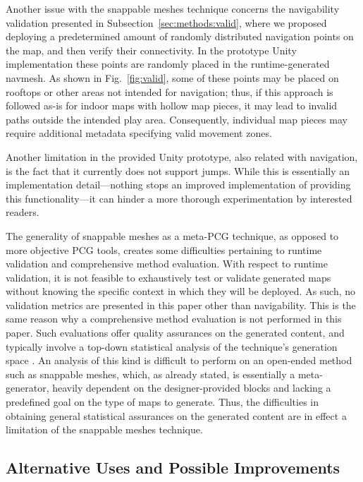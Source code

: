 \documentclass[journal]{IEEEtran}
\begin{document}
Another issue with the snappable meshes technique concerns the navigability
validation presented in Subsection~\ref{sec:methods:valid}, where we proposed
deploying a predetermined amount of randomly distributed navigation points on
the map, and then verify their connectivity. In the prototype Unity
implementation these points are randomly placed in the runtime-generated
navmesh. As shown in Fig.~\ref{fig:valid}, some of these points may be
placed on rooftops or other areas not intended for navigation; thus, if this
approach is followed as-is for indoor maps with hollow map pieces, it may lead
to invalid paths outside the intended play area. Consequently, individual map
pieces may require additional metadata specifying valid movement zones.

Another limitation in the provided Unity prototype, also related with navigation,
is the fact that it currently does not support jumps. While this is essentially an
implementation detail---nothing stops an improved implementation of providing this
functionality---it can hinder a more thorough experimentation by interested readers.

The generality of snappable meshes as a meta-PCG technique, as opposed to more
objective PCG tools, creates some difficulties pertaining to runtime validation and
comprehensive method evaluation. With respect to runtime validation, it is not feasible
to exhaustively test or validate generated maps without knowing the specific context in
which they will be deployed. As such, no validation metrics are presented in this
paper other than navigability. This is the same reason why a comprehensive method
evaluation is not performed in this paper. Such evaluations offer quality assurances
on the generated content, and typically involve a top-down statistical analysis of the
technique's generation space \cite{noor2016evaluating}. An analysis of this kind is
difficult to perform on an open-ended method such as snappable meshes, which, as already
stated, is essentially a meta-generator, heavily dependent on the designer-provided
blocks and lacking a predefined goal on the type of maps to generate. Thus, the
difficulties in obtaining general statistical assurances on the generated content are
in effect a limitation of the snappable meshes technique.

\subsection{Alternative Uses and Possible Improvements}
\label{sec:discussion:future}
\end{document}

